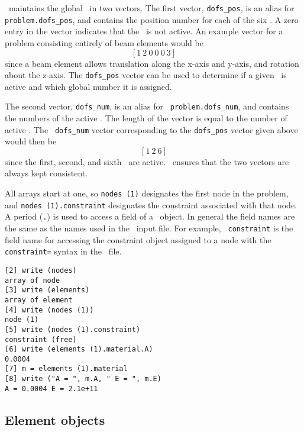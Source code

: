 \felt\ maintains the global \dofs\ in two vectors.  The first vector,
{\tt dofs\_pos}, is an alias for {\tt problem.dofs\_pos}, and contains
the position number for each of the six \dofs.  A zero entry in the
vector indicates that the \dof\ is not active.  An example vector for
a problem consisting entirely of beam elements would be
%
\begin{displaymath}
\left[ 1\ 2\ 0\ 0\ 0\ 3 \right]
\end{displaymath}
%
since a beam element allows translation along the x-axis and y-axis,
and rotation about the z-axis.  The {\tt dofs\_pos} vector can be used
to determine if a given \dof\ is active and which global number it is
assigned.

The second vector, {\tt dofs\_num}, is an alias for {\tt
problem.dofs\_num}, and contains the numbers of the active \dofs.  The
length of the vector is equal to the number of active \dofs.  The {\tt
dofs\_num} vector corresponding to the {\tt dofs\_pos} vector given
above would then be
%
\begin{displaymath}
\left[ 1\ 2\ 6 \right]
\end{displaymath}
%
since the first, second, and sixth \dofs\ are active.  \burlap\
ensures that the two vectors are always kept consistent.

All arrays start at one, so {\tt nodes (1)} designates the first node
in the problem, and {\tt nodes (1).constraint} designates the
constraint associated with that node.  A period ({\tt .}) is used to
access a field of a \felt\ object.  In general the field names are the
same as the names used in the \felt\ input file.  For example, {\tt
constraint} is the field name for accessing the constraint object
assigned to a node with the {\tt constraint=} syntax in the \felt\
file.

\begin{screen}
\begin{verbatim}
[2] write (nodes)
array of node
[3] write (elements)
array of element
[4] write (nodes (1))
node (1)
[5] write (nodes (1).constraint)
constraint (free)
[6] write (elements (1).material.A)
0.0004
[7] m = elements (1).material
[8] write ("A = ", m.A, " E = ", m.E)
A = 0.0004 E = 2.1e+11
\end{verbatim}
\end{screen}


\subsection{Element objects}

